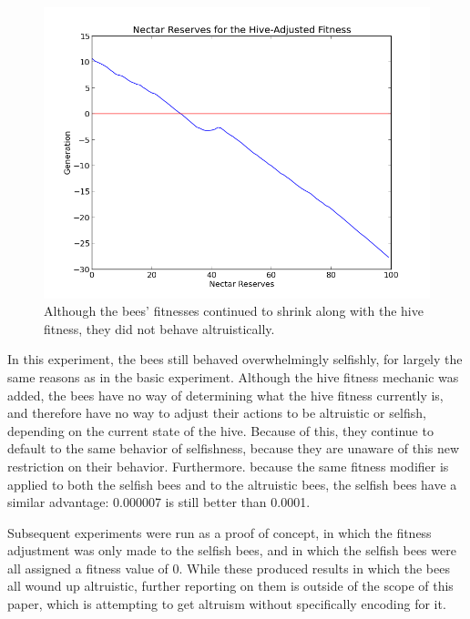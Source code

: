 \documentclass[11pt]{article}
\begin{document}
			\begin{figure}[tb]
				\begin{center}
					\includegraphics[scale=.75]{results/hive_fitness_res.png}
				\end{center}
				\caption{Although the bees' fitnesses continued to shrink along with the hive fitness, they did not behave altruistically.}
				\label{fig:hive_fitness_reserves}
			\end{figure}

			In this experiment, the bees still behaved overwhelmingly selfishly, for largely the same reasons as in the basic experiment. Although the hive fitness mechanic was added, the bees have no way of determining what the hive fitness currently is, and therefore have no way to adjust their actions to be altruistic or selfish, depending on the current state of the hive. Because of this, they continue to default to the same behavior of selfishness, because they are unaware of this new restriction on their behavior. Furthermore. because the same fitness modifier is applied to both the selfish bees and to the altruistic bees, the selfish bees have a similar advantage: 0.000007 is still better than 0.0001.

			Subsequent experiments were run as a proof of concept, in which the fitness adjustment was only made to the selfish bees, and in which the selfish bees were all assigned a fitness value of 0. While these produced results in which the bees all wound up altruistic, further reporting on them is outside of the scope of this paper, which is attempting to get altruism without specifically encoding for it.
\end{document}
